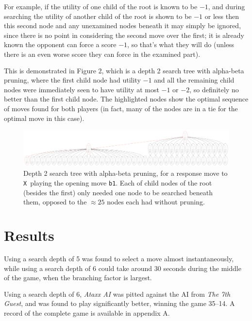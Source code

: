 \documentclass[12pt]{article}
\newcommand{\X}{\texttt{X}}
\begin{document}
For example, if the utility of one child of the root is known to be $-1$, and during searching the utility of another child of the root is shown to be $-1$ or less then this second node and any unexamined nodes beneath it may simply be ignored, since there is no point in considering the second move over the first; it is already known the opponent can force a score $-1$, so that's what they will do (unless there is an even worse score they can force in the examined part). %

This is demonstrated in Figure 2, which is a depth 2 search tree with alpha-beta pruning, where the first child node had utility $-1$ and all the remaining child nodes were immediately seen to have utility at most $-1$ or $-2$, so definitely no better than the first child node.  The highlighted nodes show the optimal sequence of moves found for both players (in fact, many of the nodes are in a tie for the optimal move in this case).

\begin{figure}\begin{center}\includegraphics[scale=0.08]{alphabeta}\end{center}\caption{Depth 2 search tree with alpha-beta pruning, for a response move to \X\ playing the opening move \texttt{b1}.  Each of child nodes of the root (besides the first) only needed one node to be searched beneath them, opposed to the $\approx25$ nodes each had without pruning.}\end{figure}

\section{Results}
Using a search depth of 5 was found to select a move almost instantaneously, while using a search depth of 6 could take around 30 seconds during the middle of the game, when the branching factor is largest.

Using a search depth of 6, \textsl{Ataxx AI} was pitted against the AI from \textsl{The 7th Guest}, and was found to play significantly better, winning the game 35--14.  A record of the complete game is available in appendix A.
\end{document}
